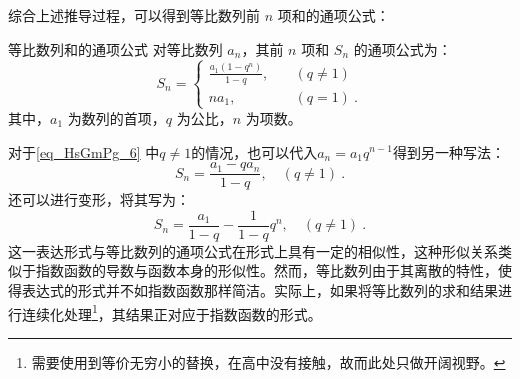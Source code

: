 综合上述推导过程，可以得到等比数列前 $n$ 项和的通项公式：
\begin{corollary}{等比数列和的通项公式}
对等比数列 ${a_n}$，其前 $n$ 项和 $S_n$ 的通项公式为：
\begin{equation}\label{eq_HsGmPg_6}
S_n = \begin{cases}
\displaystyle\frac{a_1(1 - q^n)}{1 - q}, & \quad (q \neq 1) \\
na_1, & \quad (q = 1)~.
\end{cases}
\end{equation}
其中，$a_1$ 为数列的首项，$q$ 为公比，$n$ 为项数。
\end{corollary}
对于\autoref{eq_HsGmPg_6} 中$q\neq1$的情况，也可以代入$a_n=a_1q^{n-1}$得到另一种写法：
\begin{equation}
S_n = \frac{a_1 - qa_n}{1 - q}, \quad (q \neq 1) ~.
\end{equation}
还可以进行变形，将其写为：
\begin{equation}
S_n = \frac{a_1}{1 - q} - \frac{1}{1 - q}q^n, \quad (q \neq 1)~.
\end{equation}
这一表达形式与等比数列的通项公式在形式上具有一定的相似性，这种形似关系类似于指数函数的导数与函数本身的形似性。然而，等比数列由于其离散的特性，使得表达式的形式并不如指数函数那样简洁。实际上，如果将等比数列的求和结果进行连续化处理\footnote{需要使用到等价无穷小的替换，在高中没有接触，故而此处只做开阔视野。}，其结果正对应于指数函数的形式。

